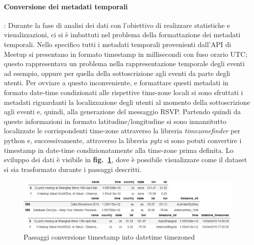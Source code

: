 \documentclass[fleqn,10pt]{SelfArx} %
\begin{document}
{{\paragraph{Conversione dei metadati temporali}: Durante la fase di analisi dei dati con l'obiettivo di realizzare statistiche e visualizzazioni, ci si è imbattuti nel problema della formattazione dei metadati temporali. 
Nello specifico tutti i metadati temporali provenienti dall'API di Meetup si presentano in formato timestamp in millisecondi con fuso orario UTC; questo rappresentava un problema nella rappresentazione temporale degli eventi ad esempio, oppure per quella della sottoscrizione agli eventi da parte degli utenti. 
Per ovviare a questo inconveniente, e formattare questi metadati in formato date-time condizionati alle rispettive time-zone locali si sono sfruttati i metadati riguardanti la localizzazione degli utenti al momento della sottoscrizione agli eventi e, quindi, alla generazione del messaggio RSVP. 
Partendo quindi da queste informazioni in formato latitudine/longitudine si sono innanzitutto localizzate le corrispondenti time-zone attraverso la libreria \textit{timezonefinder} per python e, successivamente, attraverso la libreria \textit{pytz} si sono potuti convertire i timestamp in date-time condizionatamente alla time-zone prima definita. 
Lo sviluppo dei dati è visibile in \textbf{fig.~\ref{datetime_timezoned}}, dove è possibile visualizzare come il dataset si sia trasformato durante i passaggi descritti.
\begin{figure}
\centering
\includegraphics[width = 9 cm, height = 3.5 cm]{datetime_timezoned.PNG}
\caption{\label{datetime_timezoned} Passaggi conversione timestamp into datetime timezoned}
\end{figure}
}}
\end{document}

